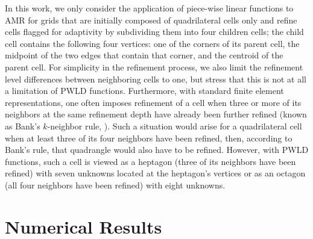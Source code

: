 \documentclass[preprint,10pt]{elsarticle}
\begin{document}
In this work, we only consider the application of piece-wise linear functions to AMR for 
grids that are initially composed of quadrilateral cells only and refine cells flagged for adaptivity 
by subdividing them into four children cells; the child cell contains the following four vertices: 
one of the corners of its parent cell, the midpoint of the two edges that contain that corner, 
and the centroid of the parent cell.
For simplicity in the refinement process, we also limit the refinement level differences between 
neighboring cells to one, but stress that this is not at all a limitation of PWLD functions.
Furthermore, with standard finite element representations, one often imposes refinement of a cell 
when three or more of its neighbors at the same refinement depth have already been 
further refined (known as Bank's $k$-neighbor rule, \cite{bank}). Such a situation would arise for a 
quadrilateral cell when at least three of its four neighbors have been refined,
then, according to Bank's rule, that quadrangle would also have to be refined. 
However, with PWLD functions, such a cell is viewed as a
heptagon (three of its neighbors have been refined) with seven unknowns located at the heptagon's vertices 
or as an octagon (all four neighbors have been refined) with eight unknowns.



 
\section{Numerical Results} \label{sec:results}
\end{document}
